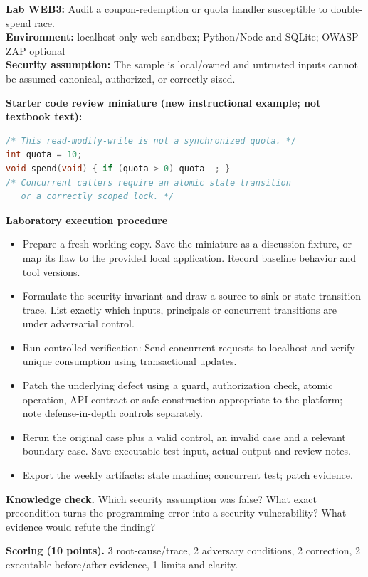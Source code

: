 \documentclass[10pt,letterpaper]{article}
\begin{document}
\begin{insight}\textbf{Lab WEB3:} Audit a coupon-redemption or quota handler susceptible to double-spend race.\\\textbf{Environment:} localhost-only web sandbox; Python/Node and SQLite; OWASP ZAP optional\\\textbf{Security assumption:} The sample is local/owned and untrusted inputs cannot be assumed canonical, authorized, or correctly sized.\end{insight}
\textbf{Starter code review miniature (new instructional example; not textbook text):}
\begin{lstlisting}[language=C]
/* This read-modify-write is not a synchronized quota. */
int quota = 10;
void spend(void) { if (quota > 0) quota--; }
/* Concurrent callers require an atomic state transition
   or a correctly scoped lock. */
\end{lstlisting}
\textbf{Laboratory execution procedure}
\begin{itemize}[leftmargin=*,itemsep=2pt]
\item Prepare a fresh working copy. Save the miniature as a discussion fixture, or map its flaw to the provided local application. Record baseline behavior and tool versions.
\item Formulate the security invariant and draw a source-to-sink or state-transition trace. List exactly which inputs, principals or concurrent transitions are under adversarial control.
\item Run controlled verification: Send concurrent requests to localhost and verify unique consumption using transactional updates.
\item Patch the underlying defect using a guard, authorization check, atomic operation, API contract or safe construction appropriate to the platform; note defense-in-depth controls separately.
\item Rerun the original case plus a valid control, an invalid case and a relevant boundary case. Save executable test input, actual output and review notes.
\item Export the weekly artifacts: state machine; concurrent test; patch evidence.
\end{itemize}
\textbf{Knowledge check.} Which security assumption was false? What exact precondition turns the programming error into a security vulnerability? What evidence would refute the finding?

\textbf{Scoring (10 points).} 3 root-cause/trace, 2 adversary conditions, 2 correction, 2 executable before/after evidence, 1 limits and clarity.
\end{document}
